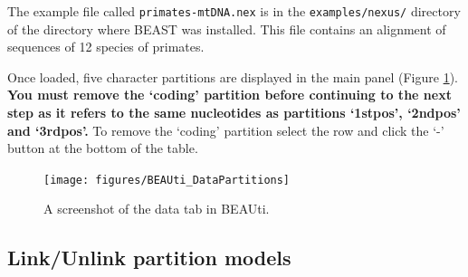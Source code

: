 \documentclass[11pt]{article}
\theoremstyle{plain}%
\theoremstyle{definition}
\theoremstyle{remark}
\begin{document}
The example file called \texttt{primates-mtDNA.nex} is in the {\tt examples/nexus/} directory of the directory where BEAST was installed.
This file contains an alignment of sequences of 12 species of primates. 
%
%
%

Once loaded, five character partitions are displayed in the main panel (Figure \ref{fig:BEAUTI_DataPartitions}). {\bf You must remove the `coding' partition before continuing to the next step as it refers to the same nucleotides as partitions `1stpos', `2ndpos' and `3rdpos'.} To remove the `coding' partition select the row and click the `-' button at the bottom of the table. 

\begin{figure}

\texttt{[image: figures/BEAUti\_DataPartitions]}
\caption{A screenshot of the data tab in BEAUti.}
\label{fig:BEAUTI_DataPartitions}
\end{figure}

%
%

\subsection*{Link/Unlink partition models}
\end{document}

